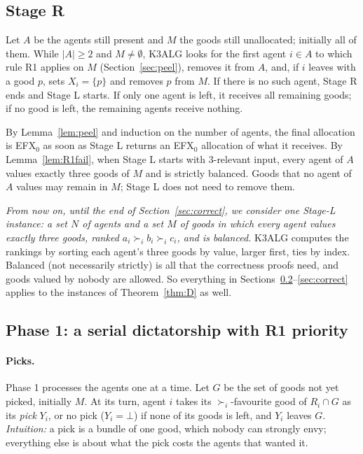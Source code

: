 \documentclass[runningheads,11pt]{llncs}
\newcommand{\efxz}{\texorpdfstring{\mbox{EFX$_0$}}{EFX0}}
\newcommand{\none}{\bot}
\begin{document}
\subsection{Stage R}\label{sec:stageR}

Let $A$ be the agents still present and $M$ the goods still unallocated; initially all of them. While $|A|\ge2$ and $M\ne\emptyset$, K3ALG looks for the first agent $i\in A$ to which rule R1 applies on $M$ (Section~\ref{sec:peel}), removes it from $A$, and, if $i$ leaves with a good $p$, sets $X_i=\{p\}$ and removes $p$ from $M$. If there is no such agent, Stage R ends and Stage L starts. If only one agent is left, it receives all remaining goods; if no good is left, the remaining agents receive nothing.

By Lemma~\ref{lem:peel} and induction on the number of agents, the final allocation is \efxz{} as soon as Stage L returns an \efxz{} allocation of what it receives. By Lemma~\ref{lem:R1fail}, when Stage L starts with $3$-relevant input, every agent of $A$ values exactly three goods of $M$ and is strictly balanced. Goods that no agent of $A$ values may remain in $M$; Stage L does not need to remove them.

\medskip\noindent\emph{From now on, until the end of Section~\ref{sec:correct}, we consider one Stage-L instance: a set $N$ of agents and a set $M$ of goods in which every agent values exactly three goods, ranked $a_i\succ_i b_i\succ_i c_i$, and is balanced.} K3ALG computes the rankings by sorting each agent's three goods by value, larger first, ties by index. Balanced (not necessarily strictly) is all that the correctness proofs need, and goods valued by nobody are allowed. So everything in Sections~\ref{sec:phase1}--\ref{sec:correct} applies to the instances of Theorem~\ref{thm:D} as well.

\subsection{Phase 1: a serial dictatorship with R1 priority}\label{sec:phase1}

\paragraph{Picks.} Phase 1 processes the agents one at a time. Let $G$ be the set of goods not yet picked, initially $M$. At its turn, agent $i$ takes its $\succ_i$-favourite good of $R_i\cap G$ as its \emph{pick} $Y_i$, or no pick ($Y_i=\none$) if none of its goods is left, and $Y_i$ leaves $G$. \emph{Intuition:} a pick is a bundle of one good, which nobody can strongly envy; everything else is about what the pick costs the agents that wanted it.
\end{document}
